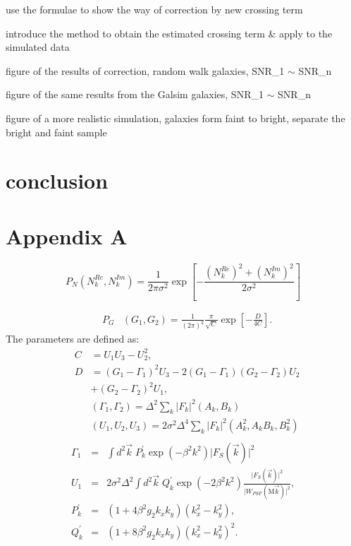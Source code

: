 \documentclass[twocolumn]{aastex62}
\begin{document}
use the formulae to show the way of correction by new crossing term

introduce the method to obtain the estimated crossing term \& apply to the simulated data

figure of the results of correction, random walk galaxies, SNR\_1 $\sim$ SNR\_n

figure of the same results from the Galsim galaxies, SNR\_1 $\sim$ SNR\_n

figure of a more realistic simulation, galaxies form faint to bright, separate the bright and faint sample

\section{conclusion}
\appendix
\section{Appendix A}\label{app_a}
\begin{equation}
P_N(N_k^{Re},N_k^{Im})=\frac{1}{2\pi\sigma^2}\exp\left[-\frac{\left(N_k^{Re}\right)^2+\left(N_k^{Im}\right)^2}{2\sigma^2}\right]
\end{equation}

\begin{eqnarray}
&P_G&\left(G_1,G_2\right)
=\frac{1}{(2\pi)^2}\frac{\pi}{\sqrt{C}}\exp\left[-\frac{D}{4C}\right].
\end{eqnarray}
The parameters are defined as:
\begin{eqnarray}
&C&=U_1U_3-U_2^2, \\ \nonumber
&D&=\left(G_1-\Gamma_1\right)^2U_3-2\left(G_1-\Gamma_1\right)\left(G_2-\Gamma_2\right)U_2 \\ \nonumber
&&+\left(G_2-\Gamma_2\right)^2U_1, \\ \nonumber
&&\left(\Gamma_1,\Gamma_2\right)=\Delta^2\sum_k\vert F_k\vert^2\left(A_k,B_k\right)\\ \nonumber
&&\left(U_1,U_2,U_3\right)=2\sigma^2\Delta^4\sum_k\vert F_k\vert^2\left(A_k^2,A_kB_k,B_k^2\right)\\ \nonumber
\end{eqnarray}
\begin{eqnarray}
\Gamma_1&=&\int{d}^2\vec{k}\;P_k^{\prime}\exp(-\beta^2k^2)\vert F_S(\vec{k})\vert^2 \\ \nonumber
U_1&=&2\sigma^2\Delta^2\int{d}^2\vec{k} \; Q_k^{\prime}\exp(-2\beta^2k^2)\frac{\vert F_S(\vec{k})\vert^2}{\vert W_{PSF}(\mathrm{M}\vec{k})\vert^2}, \\ \nonumber
P_k^{\prime}&=&\left(1+4\beta^2g_2k_xk_y\right)\left(k_x^2-k_y^2\right), \\ \nonumber
Q_k^{\prime}&=&\left(1+8\beta^2g_2k_xk_y\right)\left(k_x^2-k_y^2\right)^2.
\end{eqnarray}
\end{document}
